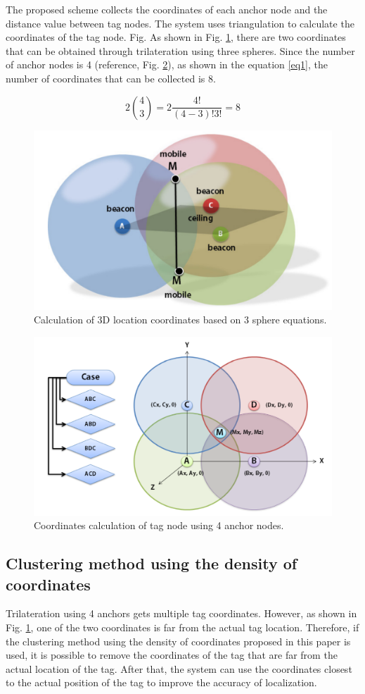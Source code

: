 \documentclass[conference]{IEEEtran}
\begin{document}
The proposed scheme collects the coordinates of each anchor node and the distance value between tag nodes. The system uses triangulation to calculate the coordinates of the tag node. Fig. As shown in Fig. \ref{fig1}, there are two coordinates that can be obtained through trilateration using three spheres. Since the number of anchor nodes is 4 (reference, Fig. \ref{fig2}), as shown in the equation \ref{eq1}, the number of coordinates that can be collected is 8.

\begin{equation}
    2\binom{4}{3} = 2\frac{4!}{(4-3)!3!}=8\label{eq1}
\end{equation}

\begin{figure}[htbp]
    \centerline{\includegraphics[width=0.62\columnwidth]{fig2.png}}
    \caption{Calculation of 3D location coordinates based on 3 sphere equations.}
    \label{fig1}
\end{figure}

\begin{figure}[htbp]
    \centerline{\includegraphics[width=0.62\columnwidth]{fig1.png}}
    \caption{Coordinates calculation of tag node using 4 anchor nodes.}
    \label{fig2}
\end{figure}

\subsection{Clustering method using the density of coordinates}
Trilateration using 4 anchors gets multiple tag coordinates. However, as shown in Fig. \ref{fig1}, one of the two coordinates is far from the actual tag location. Therefore, if the clustering method using the density of coordinates proposed in this paper is used, it is possible to remove the coordinates of the tag that are far from the actual location of the tag. After that, the system can use the coordinates closest to the actual position of the tag to improve the accuracy of localization.
\end{document}
